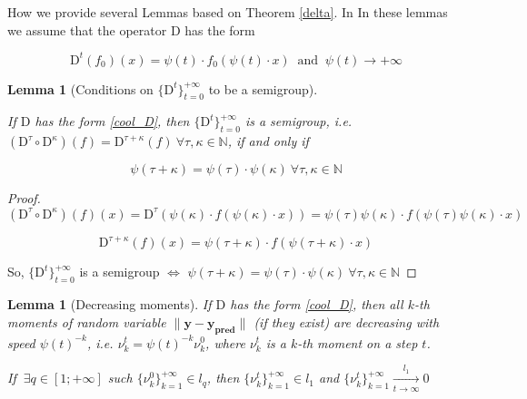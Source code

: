 \documentclass{article}
\newtheorem{lemma}[theorem]{Lemma}
\begin{document}
    How we provide several Lemmas based on Theorem \ref{delta}. In In these lemmas we assume that the operator $\text{D}$ has the form

    \begin{equation} \label{cool_D}
        \text{D}^t(f_0)(x) = \psi(t) \cdot f_0(\psi(t) \cdot x) ~\text{ and }~ \psi(t) \to +\infty
    \end{equation}


    \begin{lemma}[Conditions on $\{\text{D}^t\}_{t=0}^{+\infty}$ to be a semigroup] \label{semigroup}
    
        If $\text{D}$ has the form \eqref{cool_D}, then $\{\text{D}^t\}_{t=0}^{+\infty}$ is a semigroup, i.e. $(\text{D}^{\tau} \circ \text{D}^{\kappa})(f) = \text{D}^{\tau + \kappa}(f) ~\forall \tau, \kappa \in \mathbb{N}$, if and only if 

        \begin{equation} \label{cond_semigroup}
            \psi(\tau + \kappa) = \psi(\tau) \cdot \psi(\kappa) ~\forall \tau, \kappa \in \mathbb{N}
        \end{equation}
        
    \end{lemma}

    \begin{proof}
        \begin{equation*}
            (\text{D}^{\tau} \circ \text{D}^{\kappa})(f)(x) = \text{D}^{\tau}(\psi(\kappa) \cdot f(\psi(\kappa) \cdot x)) = \psi(\tau)\psi(\kappa) \cdot f(\psi(\tau)\psi(\kappa) \cdot x)
        \end{equation*}
            
        \begin{equation*}
            \text{D}^{\tau + \kappa}(f)(x) = \psi(\tau + \kappa) \cdot f(\psi(\tau + \kappa) \cdot x)
        \end{equation*}
        
        So, $\{\text{D}^t\}_{t=0}^{+\infty}$ is a semigroup $\Leftrightarrow$ $\psi(\tau + \kappa) = \psi(\tau) \cdot \psi(\kappa) ~\forall \tau, \kappa \in \mathbb{N}$
    \end{proof}

    \begin{lemma}[Decreasing moments] \label{moments}
        If $\text{D}$ has the form \eqref{cool_D}, then all $k$-th moments of random variable $\|\mathbf{y} - \mathbf{y_{\text{pred}}}\|$ (if they exist) are decreasing with speed $\psi(t)^{-k}$, i.e. $\nu_k^t = \psi(t)^{-k} \nu_k^0$, where $\nu_k^t$ is a $k$-th moment on a step $t$.

        If $~\exists q \in [1; +\infty]$ such $\{\nu_k^0\}_{k=1}^{+\infty} \in l_q$, then $\{\nu_k^t\}_{k=1}^{+\infty} \in l_1$ and $\{\nu_k^t\}_{k=1}^{+\infty} \underset{t \to \infty}{\overset{l_1}{\longrightarrow}} 0$
    \end{lemma}
\end{document}
